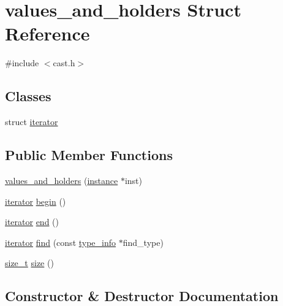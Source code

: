 \hypertarget{structvalues__and__holders}{}\section{values\+\_\+and\+\_\+holders Struct Reference}
\label{structvalues__and__holders}


{\ttfamily \#include $<$cast.\+h$>$}

\subsection*{Classes}
\begin{DoxyCompactItemize}
\item 
struct \mbox{\hyperlink{structvalues__and__holders_1_1iterator}{iterator}}
\end{DoxyCompactItemize}
\subsection*{Public Member Functions}
\begin{DoxyCompactItemize}
\item 
\mbox{\hyperlink{structvalues__and__holders_a7a02c18b548f49c1a9339dcb467a24a2}{values\+\_\+and\+\_\+holders}} (\mbox{\hyperlink{structinstance}{instance}} $\ast$inst)
\item 
\mbox{\hyperlink{structvalues__and__holders_1_1iterator}{iterator}} \mbox{\hyperlink{structvalues__and__holders_a4b6337584db727cac492ff39efd8700d}{begin}} ()
\item 
\mbox{\hyperlink{structvalues__and__holders_1_1iterator}{iterator}} \mbox{\hyperlink{structvalues__and__holders_a79960cef9a673316bd048a0f34425707}{end}} ()
\item 
\mbox{\hyperlink{structvalues__and__holders_1_1iterator}{iterator}} \mbox{\hyperlink{structvalues__and__holders_a79d8d4f6c0ce4e415ceb08c527b109c7}{find}} (const \mbox{\hyperlink{structtype__info}{type\+\_\+info}} $\ast$find\+\_\+type)
\item 
\mbox{\hyperlink{detail_2common_8h_a801d6a451a01953ef8cbae6feb6a3638}{size\+\_\+t}} \mbox{\hyperlink{structvalues__and__holders_ae7926ada8dea44baacbee204160e641d}{size}} ()
\end{DoxyCompactItemize}


\subsection{Constructor \& Destructor Documentation}
\mbox{\label{structvalues__and__holders_a7a02c18b548f49c1a9339dcb467a24a2}} 
